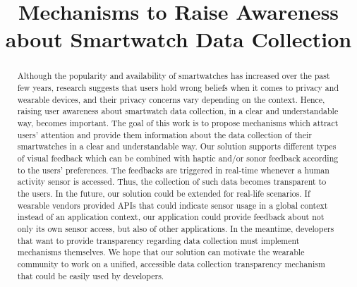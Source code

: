 \documentclass[conference, a4paper, 10pt, twocolumn]{IEEEtran}
\begin{document}
\title{Mechanisms to Raise Awareness about Smartwatch Data Collection}

\author{
	\and
}

\maketitle
\thispagestyle{plain}
\pagestyle{plain}


\begin{abstract}
Although the popularity and availability of smartwatches has increased over the past few years, research suggests that users hold wrong beliefs when it comes to privacy and wearable devices, and their privacy concerns vary depending on the context. Hence, raising user awareness about smartwatch data collection, in a clear and understandable way, becomes important. The goal of this work is to propose mechanisms which attract users' attention and provide them information about the data collection of their smartwatches in a clear and understandable way. Our solution supports different types of visual feedback which can be combined with haptic and/or sonor feedback according to the users' preferences. The feedbacks are triggered in real-time whenever a human activity sensor is accessed. Thus, the collection of such data becomes transparent to the users. In the future, our solution could be extended for real-life scenarios. If wearable vendors provided \acp{API} that could indicate sensor usage in a global context instead of an application context, our application could provide feedback about not only its own sensor access, but also of other applications. In the meantime, developers that want to provide transparency regarding data collection must implement mechanisms themselves. We hope that our solution can motivate the wearable community to work on a unified, accessible data collection transparency mechanism that could be easily used by developers.   

\end{abstract}
\end{document}
